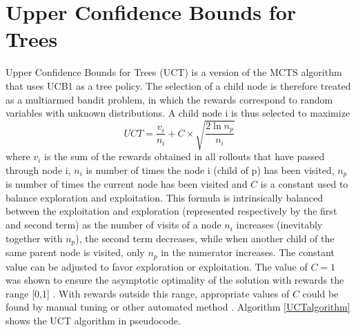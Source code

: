 \section{Upper Confidence Bounds for Trees}
Upper Confidence Bounds for Trees (UCT) is a version of the MCTS algorithm that uses UCB1 as a tree policy. The selection of a child node is therefore treated as a multiarmed bandit problem, in which the rewards correspond to random variables with unknown distributions. A child node i is thus selected to maximize
\begin{equation}\label{uctequation} 
UCT = \frac{v_i}{n_i} + C \times \sqrt{\frac{2\ln{n_p}}{n_i}} 
\end{equation}
where $v_i$ is the sum of the rewards obtained in all rollouts that have passed through node i, $n_i$ is number of times the node i (child of p) has been visited, $n_p$ is number of times the current node has been visited and $C$ is a constant used to balance exploration and exploitation. This formula is intrinsically balanced between the exploitation and exploration (represented respectively by the first and second term) as the number of visits of a node $n_i$ increases (inevitably together with $n_p$), the second term decreases, while when another child of the same parent node is visited, only $n_p$ in the numerator increases.
The constant value can be adjusted to favor exploration or exploitation. The value of $C=1$ was shown to ensure the asymptotic optimality of the solution with rewards the range [0,1] \cite{Kocsis2006ImprovedMS}. With rewards outside this range, appropriate values of $C$ could be found by manual tuning or other automated method \cite{Rubinstein1999}. Algorithm \ref{UCTalgorithm} shows the UCT algorithm in pseudocode.


